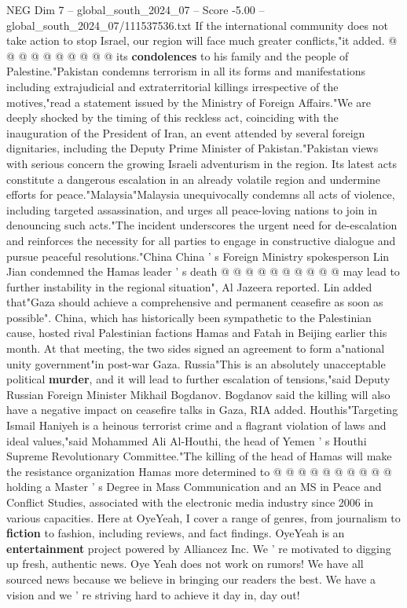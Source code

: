 \begin{textsample}{NEG Dim 7 – global\_south\_2024\_07 – Score -5.00 – global\_south\_2024\_07/111537536.txt}
If the international community does not take action to stop Israel, our region will face much greater conflicts,"it added. @ @ @ @ @ @ @ @ @ @ its \textbf{condolences} to his family and the people of Palestine."Pakistan condemns terrorism in all its forms and manifestations including extrajudicial and extraterritorial killings irrespective of the motives,"read a statement issued by the Ministry of Foreign Affairs."We are deeply shocked by the timing of this reckless act, coinciding with the inauguration of the President of Iran, an event attended by several foreign dignitaries, including the Deputy Prime Minister of Pakistan."Pakistan views with serious concern the growing Israeli adventurism in the region.
Its latest acts constitute a dangerous escalation in an already volatile region and undermine efforts for peace."Malaysia"Malaysia unequivocally condemns all acts of violence, including targeted assassination, and urges all peace-loving nations to join in denouncing such acts."The incident underscores the urgent need for de-escalation and reinforces the necessity for all parties to engage in constructive dialogue and pursue peaceful resolutions."China China ' s Foreign Ministry spokesperson Lin Jian condemned the Hamas leader ' s death @ @ @ @ @ @ @ @ @ @ may lead to further instability in the regional situation", Al Jazeera reported.
Lin added that"Gaza should achieve a comprehensive and permanent ceasefire as soon as possible".
China, which has historically been sympathetic to the Palestinian cause, hosted rival Palestinian factions Hamas and Fatah in Beijing earlier this month.
At that meeting, the two sides signed an agreement to form a"national unity government"in post-war Gaza.
Russia"This is an absolutely unacceptable political \textbf{murder}, and it will lead to further escalation of tensions,"said Deputy Russian Foreign Minister Mikhail Bogdanov.
Bogdanov said the killing will also have a negative impact on ceasefire talks in Gaza, RIA added.
Houthis"Targeting Ismail Haniyeh is a heinous terrorist crime and a flagrant violation of laws and ideal values,"said Mohammed Ali Al-Houthi, the head of Yemen ' s Houthi Supreme Revolutionary Committee."The killing of the head of Hamas will make the resistance organization Hamas more determined to @ @ @ @ @ @ @ @ @ @ holding a Master ' s Degree in Mass Communication and an MS in Peace and Conflict Studies, associated with the electronic media industry since 2006 in various capacities.
Here at OyeYeah, I cover a range of genres, from journalism to \textbf{fiction} to fashion, including reviews, and fact findings.
OyeYeah is an \textbf{entertainment} project powered by Alliancez Inc.
We ' re motivated to digging up fresh, authentic news.
Oye Yeah does not work on rumors!
We have all sourced news because we believe in bringing our readers the best.
We have a vision and we ' re striving hard to achieve it day in, day out!

\end{textsample}
